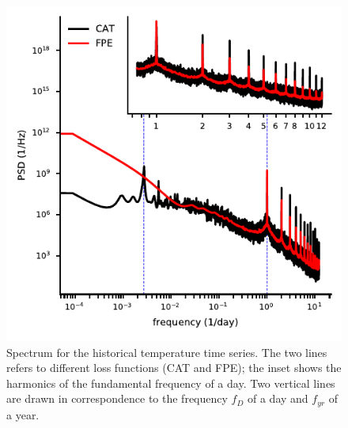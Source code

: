 \documentclass{aa}
\begin{document}
\begin{figure}
	\caption{Spectrum for the historical temperature time series. The two lines refers to different loss functions (CAT and FPE); the inset shows the harmonics of the fundamental frequency of a day. Two vertical lines are drawn in correspondence to the frequency $f_D$ of a day and $f_{yr}$ of a year.}
	\label{fig:temp_spectrum}
	\includegraphics{Images/climate_plots/temp_spectrum.pdf}
\end{figure}
\end{document}
